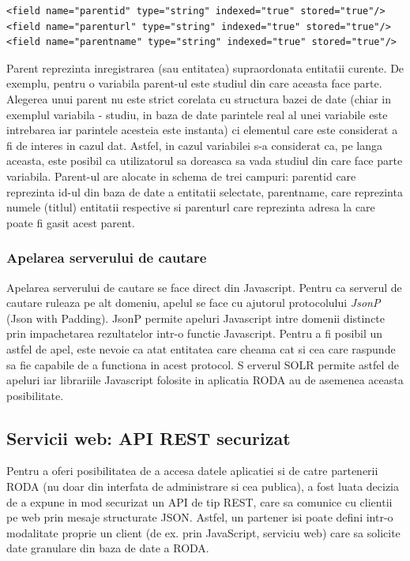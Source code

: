 \documentclass[a4paper, 10pt]{article}
\begin{document}
{\begin{lstlisting}[breaklines=true]
<field name="parentid" type="string" indexed="true" stored="true"/>
<field name="parenturl" type="string" indexed="true" stored="true"/>
<field name="parentname" type="string" indexed="true" stored="true"/>
\end{lstlisting}
Parent reprezinta inregistrarea (sau entitatea) supraordonata entitatii curente. 
De exemplu, pentru o variabila parent-ul este studiul din care aceasta face parte. 
Alegerea unui parent nu este strict corelata cu structura bazei de date (chiar in exemplul variabila - studiu, in baza de date parintele real al unei variabile este intrebarea iar parintele acesteia este instanta) 
ci elementul care este considerat a fi de interes in cazul dat. 
Astfel, in cazul variabilei s-a considerat ca, pe langa aceasta, este posibil ca utilizatorul sa doreasca sa vada studiul din care face parte variabila. 
Parent-ul are alocate in schema de trei campuri: parentid care reprezinta id-ul din baza de date a entitatii selectate, parentname, 
care reprezinta numele (titlul) entitatii respective si parenturl care reprezinta adresa la care poate fi gasit acest parent. 

\subsubsection{Apelarea serverului de cautare}

Apelarea serverului de cautare se face direct din Javascript. 
Pentru ca serverul de cautare ruleaza pe alt domeniu, apelul se face cu ajutorul protocolului \emph{JsonP} (Json with Padding). 
JsonP permite apeluri Javascript intre domenii distincte prin impachetarea rezultatelor intr-o functie Javascript. 
Pentru a fi posibil un astfel de apel, este nevoie ca atat entitatea care cheama cat si cea care raspunde sa fie capabile de a functiona in acest protocol. S
erverul SOLR permite astfel de apeluri iar librariile Javascript folosite in aplicatia RODA au de asemenea aceasta posibilitate. 

\subsection{Servicii web: API REST securizat}

Pentru a oferi posibilitatea de a accesa datele aplicatiei si de catre partenerii RODA 
(nu doar din interfata de administrare si cea publica), a fost luata decizia de a expune in mod securizat
un API de tip REST, care sa comunice cu clientii pe web prin mesaje structurate JSON.
Astfel, un partener isi poate defini intr-o modalitate proprie un client (de ex. prin JavaScript, serviciu web)
care sa solicite date granulare din baza de date a RODA.

}
\end{document}
